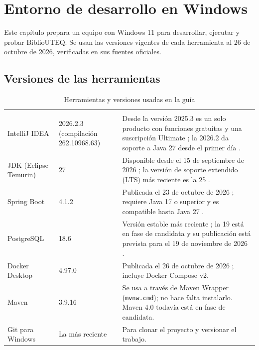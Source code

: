 \chapter{Entorno de desarrollo en Windows}\label{cap:entorno}

Este capítulo prepara un equipo con Windows 11 para desarrollar, ejecutar y probar BiblioUTEQ. Se usan las versiones vigentes de cada herramienta al 26 de octubre de 2026, verificadas en sus fuentes oficiales.

\section{Versiones de las herramientas}

\begin{xltabular}{\linewidth}{@{}L{3.4cm}L{2.9cm}Y@{}}
	\caption{Herramientas y versiones usadas en la guía}\label{tab:versiones}\\
	\toprule
	 &  &  \\
	\midrule
	\endfirsthead
	\toprule
	 &  &  \\
	\midrule
	\endhead
	IntelliJ IDEA & 2026.2.3 (compilación 262.10968.63) & Desde la versión 2025.3 es un solo producto con funciones gratuitas y una suscripción Ultimate \cite{jetbrains2025unified}; la 2026.2 da soporte a Java 27 desde el primer día \cite{jetbrains2026idea}. \\
	\addlinespace
	JDK (Eclipse Temurin) & 27 & Disponible desde el 15 de septiembre de 2026 \cite{oracle2026jdk27}; la versión de soporte extendido (LTS) más reciente es la 25 \cite{adoptium2026releases}. \\
	\addlinespace
	Spring Boot & 4.1.2 & Publicada el 23 de octubre de 2026 \cite{spring2026boot412}; requiere Java 17 o superior y es compatible hasta Java 27 \cite{spring2026requirements}. \\
	\addlinespace
	PostgreSQL & 18.6 & Versión estable más reciente \cite{pgdg2026postgresql}; la 19 está en fase de candidata y su publicación está prevista para el 19 de noviembre de 2026 \cite{pgdg2026rc}. \\
	\addlinespace
	Docker Desktop & 4.97.0 & Publicada el 26 de octubre de 2026 \cite{docker2026desktop}; incluye Docker Compose v2. \\
	\addlinespace
	Maven & 3.9.16 & Se usa a través de Maven Wrapper (\texttt{mvnw.cmd}); no hace falta instalarlo. Maven 4.0 todavía está en fase de candidata. \\
	\addlinespace
	Git para Windows & La más reciente & Para clonar el proyecto y versionar el trabajo. \\
	\bottomrule
\end{xltabular}

